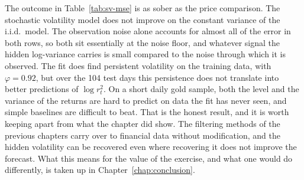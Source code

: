 The outcome in Table~\ref{tab:sv-mse} is as sober as the price comparison. The stochastic volatility model does not improve on the constant variance of the i.i.d.\ model. The observation noise alone accounts for almost all of the error in both rows, so both sit essentially at the noise floor, and whatever signal the hidden log-variance carries is small compared to the noise through which it is observed. The fit does find persistent volatility on the training data, with $\varphi = 0.92$, but over the 104 test days this persistence does not translate into better predictions of $\log r_t^2$.  On a short daily gold sample, both the level and the variance of the returns are hard to predict on data the fit has never seen, and simple baselines are difficult to beat. That is the honest result, and it is worth keeping apart from what the chapter did show. The filtering methods of the previous chapters carry over to financial data without modification, and the hidden volatility can be recovered even where recovering it does not improve the forecast. What this means for the value of the exercise, and what one would do differently, is taken up in Chapter~\ref{chap:conclusion}.